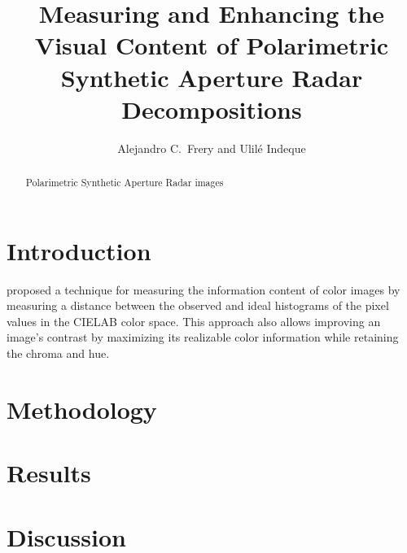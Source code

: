 \documentclass[12pt]{article}
\title{Measuring and Enhancing the Visual Content of Polarimetric Synthetic Aperture Radar Decompositions}
\author{Alejandro C.\ Frery and Ulil\'e Indeque}
\date{}
\begin{document}
\maketitle
\begin{abstract}
Polarimetric Synthetic Aperture Radar images
\end{abstract}

\section{Introduction}

\citet{AssessingInformationContentinColorImages} proposed a technique for measuring the information content of color images by measuring a distance between the observed and ideal histograms of the pixel values in the CIELAB color space.
This approach also allows improving an image's contrast by maximizing its realizable color information while retaining the chroma and hue.


\section{Methodology}


\section{Results}

\section{Discussion}



\end{document}
